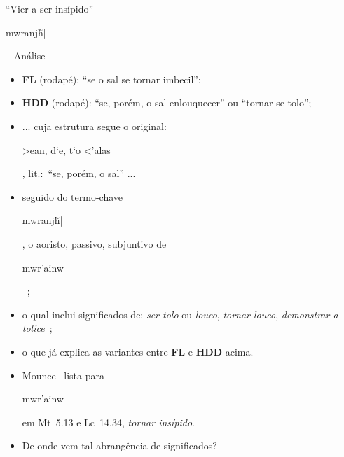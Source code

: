 \documentclass[12pt,aspectratio=169]{beamer}
\newcommand{\YEL}[1]{{\textcolor{TXyel}{#1}}}
\newcommand{\GRE}[1]{{\textcolor{TXgre}{#1}}}
\newcommand{\CYA}[1]{{\textcolor{TXcya}{#1}}}
\newcommand{\MAG}[1]{{\textcolor{TXmag}{#1}}}
\newcommand{\BRI}[1]{{\textcolor{BSpbg}{#1}}}   %
\newcommand{\GRtxt}[1]{\begin{otherlanguage}{greek}{{#1}}\end{otherlanguage}}
\begin{document}
    \begin{frame}{\BRI{``Vier a ser insípido''} -- \BRI{\GRtxt{mwranj\~h|}} -- \BRI{Análise}}
        \begin{itemize}
            \item<1-> \BRI{\textbf{FL}} (rodapé): \MAG{``se o sal se tornar imbecil''};
                \\[\medskipamount]
            \item<2-> \BRI{\textbf{HDD}} (rodapé): \MAG{``se, porém, o sal enlouquecer''} ou
                \MAG{``tornar-se tolo''};
                \\[\medskipamount]
            \item<3-> ... cuja estrutura segue o original: \YEL{\GRtxt{>ean, d`e, t`o <'alas}},
                lit.:~\MAG{``se, porém, o sal''} ...
                \\[\medskipamount]
            \item<4-> seguido do termo-chave \YEL{\GRtxt{mwranj\~h|}}, o \GRE{aoristo},
                \GRE{passivo}, \GRE{subjuntivo} de
                \YEL{\GRtxt{mwr'ainw}}~\cite{2013-MounceWD-VidaNova,
                2007-FribergB+FribergT-VidaNova, 2009-MounceWD-Vida}; %
                \\[\medskipamount]
            \item<5-> o qual inclui significados de: \CYA{\textit{ser tolo} ou \textit{louco}},
                \CYA{\textit{tornar louco}}, \CYA{\textit{demonstrar a
                tolice}}~\cite{2013-MounceWD-VidaNova};
                \\[\medskipamount]
            \item<6-> o que já explica as variantes entre \BRI{\textbf{FL}} e \BRI{\textbf{HDD}}
                acima.
                \\[\medskipamount]
            \item<7-> Mounce~\cite{2013-MounceWD-VidaNova} lista para \YEL{\GRtxt{mwr'ainw}} em
                \BRI{Mt~5.13} e \BRI{Lc~14.34}, \CYA{\textit{tornar insípido}}.
                \\[\medskipamount]
            \item<8-> De onde vem tal abrangência de significados?
        \end{itemize}
    \end{frame}
\end{document}
